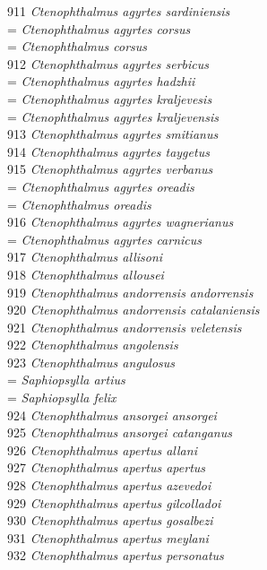 \documentclass[
]{article}
\begin{document}
911 \emph{Ctenophthalmus agyrtes sardiniensis}\\
= \emph{Ctenophthalmus agyrtes corsus}\\
= \emph{Ctenophthalmus corsus}\\
912 \emph{Ctenophthalmus agyrtes serbicus}\\
= \emph{Ctenophthalmus agyrtes hadzhii}\\
= \emph{Ctenophthalmus agyrtes kraljevesis}\\
= \emph{Ctenophthalmus agyrtes kraljevensis}\\
913 \emph{Ctenophthalmus agyrtes smitianus}\\
914 \emph{Ctenophthalmus agyrtes taygetus}\\
915 \emph{Ctenophthalmus agyrtes verbanus}\\
= \emph{Ctenophthalmus agyrtes oreadis}\\
= \emph{Ctenophthalmus oreadis}\\
916 \emph{Ctenophthalmus agyrtes wagnerianus}\\
= \emph{Ctenophthalmus agyrtes carnicus}\\
917 \emph{Ctenophthalmus allisoni}\\
918 \emph{Ctenophthalmus allousei}\\
919 \emph{Ctenophthalmus andorrensis andorrensis}\\
920 \emph{Ctenophthalmus andorrensis catalaniensis}\\
921 \emph{Ctenophthalmus andorrensis veletensis}\\
922 \emph{Ctenophthalmus angolensis}\\
923 \emph{Ctenophthalmus angulosus}\\
= \emph{Saphiopsylla artius}\\
= \emph{Saphiopsylla felix}\\
924 \emph{Ctenophthalmus ansorgei ansorgei}\\
925 \emph{Ctenophthalmus ansorgei catanganus}\\
926 \emph{Ctenophthalmus apertus allani}\\
927 \emph{Ctenophthalmus apertus apertus}\\
928 \emph{Ctenophthalmus apertus azevedoi}\\
929 \emph{Ctenophthalmus apertus gilcolladoi}\\
930 \emph{Ctenophthalmus apertus gosalbezi}\\
931 \emph{Ctenophthalmus apertus meylani}\\
932 \emph{Ctenophthalmus apertus personatus}\\
\end{document}
